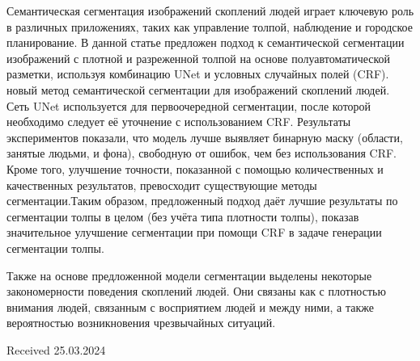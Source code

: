 \documentclass{article}
\begin{document}
\begin{multicols}{2}
\begin{thebibliography}{99}
\begin{center}
\end{center}
\setlength{\parskip}{0pt}
\normalsize
\justifying
Семантическая сегментация изображений скоплений людей играет ключевую роль в различных приложениях, таких как управление толпой, наблюдение и городское планирование. В данной статье предложен подход к семантической сегментации изображений с плотной и разреженной толпой на основе полуавтоматической разметки, используя комбинацию UNet и условных случайных полей (CRF).
\vspace{0pt}
 новый метод семантической сегментации для изображений скоплений людей. Сеть UNet используется для первоочередной сегментации, после которой необходимо следует её уточнение с использованием CRF. Результаты экспериментов показали, что модель лучше выявляет бинарную маску (области, занятые людьми, и фона), свободную от ошибок, чем без использования CRF. Кроме того, улучшение точности, показанной с помощью количественных и качественных результатов, превосходит существующие методы сегментации.Таким образом, предложенный подход даёт лучшие результаты по сегментации толпы в целом (без учёта типа плотности толпы), показав значительное улучшение сегментации при помощи CRF в задаче генерации сегментации толпы.
\vspace{0pt}
\par Также на основе предложенной модели сегментации выделены некоторые закономерности поведения скоплений людей. Они связаны как с плотностью внимания людей, связанным с восприятием людей и между ними, а также вероятностью возникновения чрезвычайных ситуаций.

\vspace{0cm}

\begin{flushright}
Received 25.03.2024
\end{flushright}

\end{thebibliography}
\end{multicols}
\end{document}
